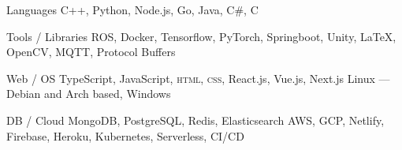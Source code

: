 

\begin{cvskills}

  \cvskill
  {Languages} %
  {C++, Python, Node.js, Go, Java, C\#, C} %

  \cvskill
  {Tools / Libraries} %
  {ROS, Docker, Tensorflow, PyTorch, Springboot, Unity, \LaTeX, OpenCV, MQTT, Protocol Buffers} %

  \cvskill
  {Web / OS} %
  {TypeScript, JavaScript, \textsc{html}, \textsc{css}, React.js, Vue.js, Next.js {\enskip\cdotp\enskip} Linux --- Debian and Arch based, Windows} %

  \cvskill
  {DB / Cloud} %
  {MongoDB, PostgreSQL, Redis, Elasticsearch {\enskip\cdotp\enskip} AWS, GCP, Netlify, Firebase, Heroku, Kubernetes, Serverless, CI/CD} %

\end{cvskills}
